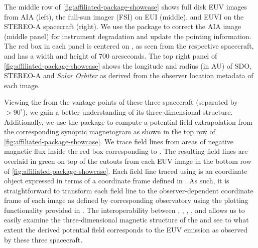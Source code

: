 The middle row of \autoref{fig:affiliated-package-showcase} shows full disk EUV images from AIA (left), the full-sun imager (FSI) on EUI (middle), and EUVI on the STEREO-A spacecraft (right).
We use the \aiapypkg package to correct the AIA image (middle panel) for instrument degradation and update the pointing information.
The red box in each panel is centered on , as seen from the respective spacecraft, and has a width and height of 700 arcseconds.
The top right panel of \autoref{fig:affiliated-package-showcase} shows the \hgs longitude and radius (in AU) of SDO, STEREO-A and \textit{Solar Orbiter} as derived from the observer location metadata of each image.

Viewing the \AR from the vantage points of these three spacecraft (separated by $>90^{\circ}$), we gain a better understanding of its three-dimensional structure.
Additionally, we use the  package to compute a potential field extrapolation from the corresponding synoptic magnetogram as shown in the top row of \autoref{fig:affiliated-package-showcase}.
We trace field lines from areas of negative magnetic flux inside the red box corresponding to .
The resulting field lines are overlaid in green on top of the cutouts from each EUV image in the bottom row of \autoref{fig:affiliated-package-showcase}.
Each field line traced using  is an \astropypkg coordinate object expressed in terms of a \hgc coordinate frame defined in \sunpypkg.
As such, it is straightforward to transform each field line to the observer-dependent coordinate frame of each image as defined by corresponding observatory using the plotting functionality provided in \astropypkg.
The interoperability between \astropypkg, \sunpypkg, , \aiapypkg, and  allows us to easily examine the three-dimensional magnetic structure of the \AR and see to what extent the derived potential field corresponds to the EUV emission as observed by these three spacecraft.
